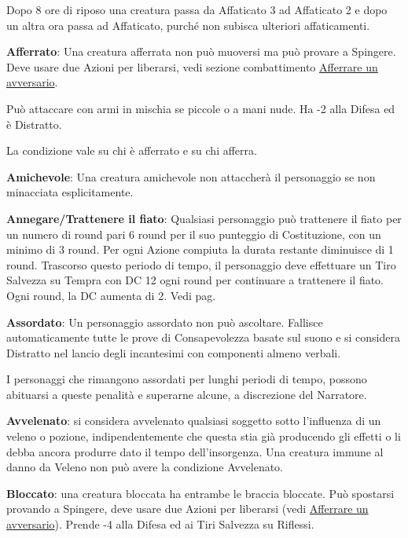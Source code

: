 \begin{multicols}{2}
\medskip

Dopo 8 ore di riposo una creatura passa da Affaticato 3 ad Affaticato 2 e dopo un altra ora passa ad Affaticato, purché non subisca ulteriori affaticamenti.

\medskip

\textbf{Afferrato}: Una creatura afferrata non può muoversi ma può provare a Spingere. Deve usare due Azioni per liberarsi, vedi sezione combattimento \hyperlink{afferrareunavversario}{Afferrare un avversario}.

Può attaccare con armi in mischia se piccole o a mani nude. Ha -2 alla Difesa ed è Distratto.

La condizione vale su chi è afferrato e su chi afferra.

\textbf{Amichevole}: Una creatura amichevole non attaccherà il personaggio se non minacciata esplicitamente.

\textbf{Annegare/Trattenere il fiato}:  Qualsiasi personaggio può trattenere il fiato per un numero di round pari 6 round per il suo punteggio di Costituzione, con un minimo di 3 round. Per ogni Azione compiuta la durata restante diminuisce di 1 round. Trascorso questo periodo di tempo, il personaggio deve effettuare un Tiro Salvezza su Tempra con DC 12 ogni round per continuare a trattenere il fiato. Ogni round, la DC aumenta di 2. Vedi pag. \pageref{trattenereilfiato}

\textbf{Assordato}: Un personaggio assordato non può ascoltare. Fallisce automaticamente tutte le prove di Consapevolezza basate sul suono e si considera Distratto nel lancio degli incantesimi con componenti almeno verbali.

I personaggi che rimangono assordati per lunghi periodi di tempo, possono abituarsi a queste penalità e superarne alcune, a discrezione del Narratore.

\textbf{Avvelenato}: si considera avvelenato qualsiasi soggetto sotto l'influenza di un veleno o pozione, indipendentemente che questa stia già producendo gli effetti o li debba ancora produrre dato il tempo dell'insorgenza. Una creatura immune al danno da Veleno non può avere la condizione Avvelenato.

\textbf{Bloccato}\hypertarget{bloccato}{}: una creatura bloccata ha entrambe le braccia bloccate. Può spostarsi provando a Spingere, deve usare due Azioni per liberarsi (vedi \hyperlink{afferrareunavversario}{Afferrare un avversario}). Prende -4 alla Difesa ed ai Tiri Salvezza su Riflessi.


\end{multicols}
